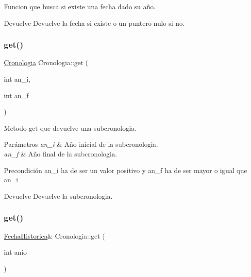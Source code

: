 Funcion que busca si existe una fecha dado su año. 

\begin{DoxyReturn}{Devuelve}
Devuelve la fecha si existe o un puntero nulo si no. 
\end{DoxyReturn}
\mbox{\label{classCronologia_a06c36b588d8beb46bab98cbc2cc7e8b2}} 
\subsubsection{\texorpdfstring{get()}{get()}\hspace{0.1cm}{\footnotesize\ttfamily [1/2]}}
{\footnotesize\ttfamily \hyperlink{classCronologia}{Cronologia} Cronologia\+::get (\begin{DoxyParamCaption}\item[{int}]{an\+\_\+i,  }\item[{int}]{an\+\_\+f }\end{DoxyParamCaption})}



Metodo get que devuelve una subcronologia. 


\begin{DoxyParams}{Parámetros}
{\em an\+\_\+i} & Año inicial de la subcronologia. \\
\hline
{\em an\+\_\+f} & Año final de la subcronologia. \\
\hline
\end{DoxyParams}
\begin{DoxyPrecond}{Precondición}
an\+\_\+i ha de ser un valor positivo y an\+\_\+f ha de ser mayor o igual que an\+\_\+i 
\end{DoxyPrecond}
\begin{DoxyReturn}{Devuelve}
Devuelve la subcronologia. 
\end{DoxyReturn}
\mbox{\label{classCronologia_a89b4417bb43cbd109b0bbfcc0ec01e3d}} 
\subsubsection{\texorpdfstring{get()}{get()}\hspace{0.1cm}{\footnotesize\ttfamily [2/2]}}
{\footnotesize\ttfamily \hyperlink{classFechaHistorica}{Fecha\+Historica}\& Cronologia\+::get (\begin{DoxyParamCaption}\item[{int}]{anio }\end{DoxyParamCaption})}



